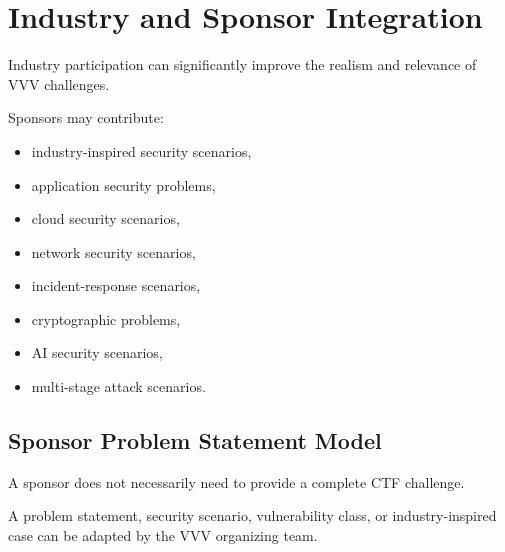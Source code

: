 \documentclass[11pt,a4paper]{article}
\begin{document}

\section{Industry and Sponsor Integration}

Industry participation can significantly improve the realism and
relevance of VVV challenges.

Sponsors may contribute:

\begin{itemize}

    \item industry-inspired security scenarios,

    \item application security problems,

    \item cloud security scenarios,

    \item network security scenarios,

    \item incident-response scenarios,

    \item cryptographic problems,

    \item AI security scenarios,

    \item multi-stage attack scenarios.

\end{itemize}


\subsection{Sponsor Problem Statement Model}

A sponsor does not necessarily need to provide a complete CTF
challenge.

A problem statement, security scenario, vulnerability class, or
industry-inspired case can be adapted by the VVV organizing team.
\end{document}
